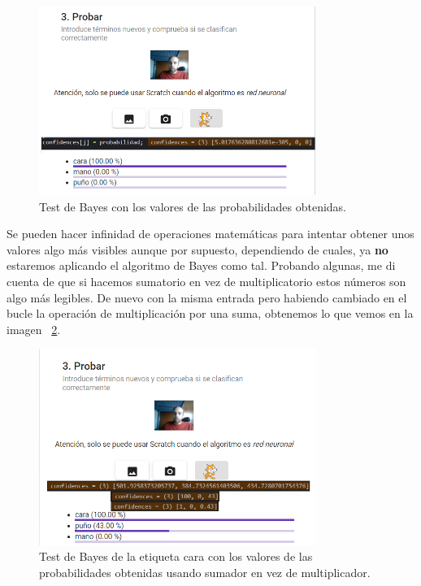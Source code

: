 \documentclass[a4paper, 12pt]{book}
\begin{document}
\begin{figure}
	\centering
	\includegraphics[width=9cm, keepaspectratio]{img/bayestestcara}
	\caption{Test de Bayes con los valores de las probabilidades obtenidas.}			
	\label{fig:bayestestcara}
\end{figure}

Se pueden hacer infinidad de operaciones matemáticas para intentar obtener unos valores algo más visibles aunque por supuesto, dependiendo de cuales, ya \textbf{no} estaremos aplicando el algoritmo de Bayes como tal. Probando algunas, me di cuenta de que si hacemos sumatorio en vez de multiplicatorio estos números son algo más legibles. De nuevo con la misma entrada pero habiendo cambiado en el bucle la operación de multiplicación por una suma, obtenemos lo que vemos en la imagen ~\ref{fig:bayestestcarasuma}.

\begin{figure}
	\centering
	\includegraphics[width=9cm, keepaspectratio]{img/bayestestcarasuma}
	\caption{Test de Bayes de la etiqueta cara con los valores de las probabilidades obtenidas usando sumador en vez de multiplicador.}			
	\label{fig:bayestestcarasuma}
\end{figure}
\end{document}
